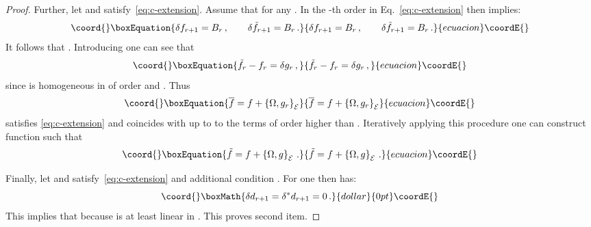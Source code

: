 \documentclass[a4paper,11pt]{amsart}
\numberwithin{thm}{section} %
\numberwithin{equation}{section} %
\numberwithin{figure}{section} %
\providecommand{\pb}[2]{\left\{{}#1{},{}#2{}\right\}}
\providecommand{\gh}[1]{{\rm gh}(#1)}
\renewcommand{\:}{{\rm\, :\,}}
\def\bar{\overline}
\def\E{{ \mathcal E}}
\begin{document}
\begin{proof}
Further, let \coordHE{} and \coordHE{} satisfy~\eqref{eq:c-extension}.
Assume that \coordHE{} for any \coordHE{}.  In the
\coordHE{}-th order in \coordHE{} Eq.~\eqref{eq:c-extension} then implies:
\begin{equation}\coord{}\boxEquation{
\delta f_{r+1}=B_r\,, \qquad \delta {{\tilde f}_{r+1}}=B_r\,.
}{
\delta f_{r+1}=B_r\,, \qquad \delta {{\tilde f}_{r+1}}=B_r\,.
}{ecuacion}\coordE{}\end{equation}
It follows that \coordHE{}. Introducing
\coordHE{} one can see that
\begin{equation}\coord{}\boxEquation{
  {\tilde f}_r-f_r=\delta g_r\,,
}{
  {\tilde f}_r-f_r=\delta g_r\,,
}{ecuacion}\coordE{}\end{equation}
since \coordHE{} is homogeneous in \coordHE{} of order \coordHE{} and
\myHighlight{$\gh{g_r}=\gh{f}-1$}\coordHE{}. Thus
\begin{equation}\coord{}\boxEquation{
{\bar f}=f+\pb{\Omega}{g_r}_\E
}{
{\bar f}=f+\pb{\Omega}{g_r}_\E
}{ecuacion}\coordE{}\end{equation}
satisfies \eqref{eq:c-extension} and coincides with \coordHE{} up to
to the terms of order higher than \coordHE{}. Iteratively applying
this procedure one can construct function \coordHE{}
such that
\begin{equation}\coord{}\boxEquation{
  {\tilde f}=f+\pb{\Omega}{g}_\E\,.
}{
  {\tilde f}=f+\pb{\Omega}{g}_\E\,.
}{ecuacion}\coordE{}\end{equation}


Finally, let \coordHE{} and \coordHE{} satisfy~\eqref{eq:c-extension}
and additional condition
\coordHE{}. For
\coordHE{} one then has:
$$\coord{}\boxMath{
\delta d_{r+1}=\delta^* d_{r+1}=0\,.
}{dollar}{0pt}\coordE{}$$
This implies that \coordHE{} because \coordHE{} is at least linear in
\coordHE{}.  This proves second item.
\end{proof}
\end{document}
